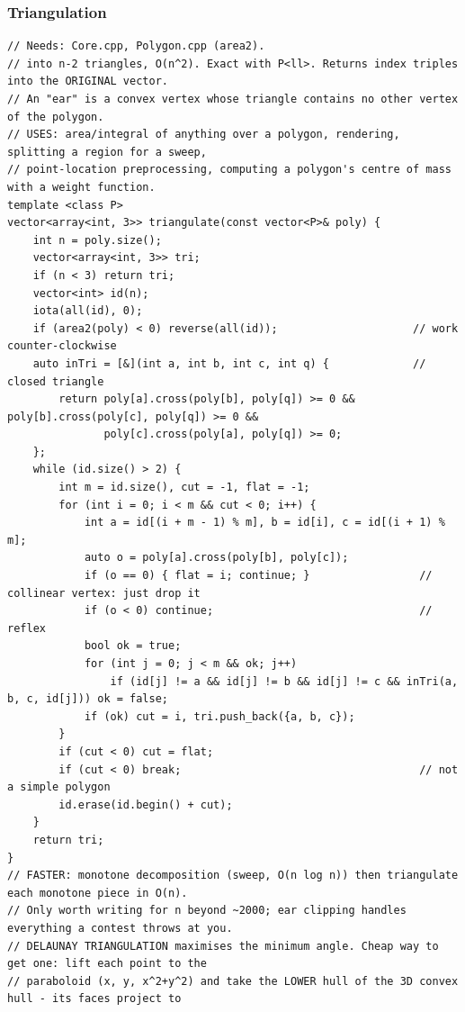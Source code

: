 \documentclass[9pt,a4paper,twocolumn]{extarticle}
\begin{document}
\filbreak
\subsubsection{Triangulation}
\nopagebreak
\begin{lstlisting}
// Needs: Core.cpp, Polygon.cpp (area2).
// into n-2 triangles, O(n^2). Exact with P<ll>. Returns index triples into the ORIGINAL vector.
// An "ear" is a convex vertex whose triangle contains no other vertex of the polygon.
// USES: area/integral of anything over a polygon, rendering, splitting a region for a sweep,
// point-location preprocessing, computing a polygon's centre of mass with a weight function.
template <class P>
vector<array<int, 3>> triangulate(const vector<P>& poly) {
    int n = poly.size();
    vector<array<int, 3>> tri;
    if (n < 3) return tri;
    vector<int> id(n);
    iota(all(id), 0);
    if (area2(poly) < 0) reverse(all(id));                     // work counter-clockwise
    auto inTri = [&](int a, int b, int c, int q) {             // closed triangle
        return poly[a].cross(poly[b], poly[q]) >= 0 && poly[b].cross(poly[c], poly[q]) >= 0 &&
               poly[c].cross(poly[a], poly[q]) >= 0;
    };
    while (id.size() > 2) {
        int m = id.size(), cut = -1, flat = -1;
        for (int i = 0; i < m && cut < 0; i++) {
            int a = id[(i + m - 1) % m], b = id[i], c = id[(i + 1) % m];
            auto o = poly[a].cross(poly[b], poly[c]);
            if (o == 0) { flat = i; continue; }                 // collinear vertex: just drop it
            if (o < 0) continue;                                // reflex
            bool ok = true;
            for (int j = 0; j < m && ok; j++)
                if (id[j] != a && id[j] != b && id[j] != c && inTri(a, b, c, id[j])) ok = false;
            if (ok) cut = i, tri.push_back({a, b, c});
        }
        if (cut < 0) cut = flat;
        if (cut < 0) break;                                     // not a simple polygon
        id.erase(id.begin() + cut);
    }
    return tri;
}
// FASTER: monotone decomposition (sweep, O(n log n)) then triangulate each monotone piece in O(n).
// Only worth writing for n beyond ~2000; ear clipping handles everything a contest throws at you.
// DELAUNAY TRIANGULATION maximises the minimum angle. Cheap way to get one: lift each point to the
// paraboloid (x, y, x^2+y^2) and take the LOWER hull of the 3D convex hull - its faces project to

\end{lstlisting}
\end{document}
